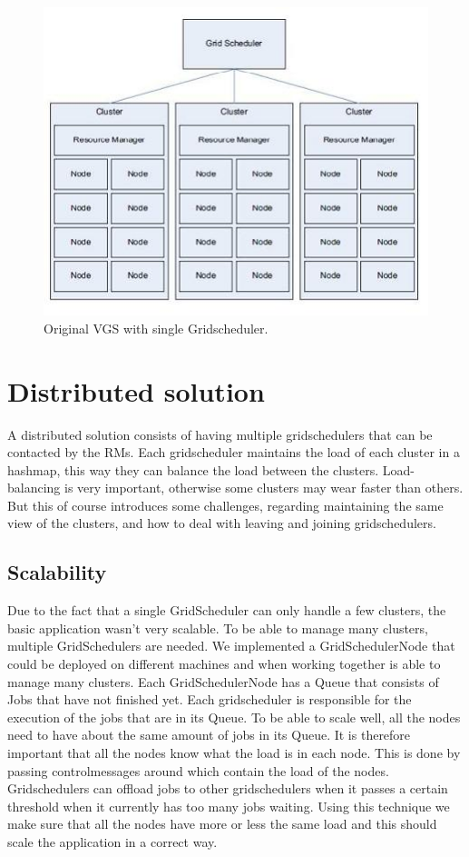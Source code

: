 \documentclass[twocolumn,a4paper]{article}
\begin{document}
\begin{figure}
	\includegraphics[scale=0.7]{singleGS.jpg}
	\caption{Original VGS with single Gridscheduler.}
\end{figure}

\section{Distributed solution}
A distributed solution consists of having multiple gridschedulers that can be contacted by the RMs. Each gridscheduler maintains the load of each cluster in a hashmap, this way they can balance the load between the clusters. Load-balancing is very important, otherwise some clusters may wear faster than others. But this of course introduces some challenges, regarding maintaining the same view of the clusters, and how to deal with leaving and joining gridschedulers.

\subsection{Scalability}
Due to the fact that a single GridScheduler can only handle a few clusters, the basic application wasn't very scalable. To be able to manage many clusters, multiple GridSchedulers are needed. We implemented a  GridSchedulerNode that could be deployed on different machines and when working together is able to manage many clusters. Each GridSchedulerNode has a Queue that consists of Jobs that have not finished yet. Each gridscheduler is responsible for the execution of the jobs that are in its Queue. To be able to scale well, all the nodes need to have about the same amount of jobs in its Queue. It is therefore important that all the nodes know what the load is in each node. This is done by passing controlmessages around which contain the load of the nodes. Gridschedulers can offload jobs to other gridschedulers when it passes a certain threshold when it currently has too many jobs waiting. Using this technique we make sure that all the nodes have more or less the same load and this should scale the application in a correct way.
\end{document}
